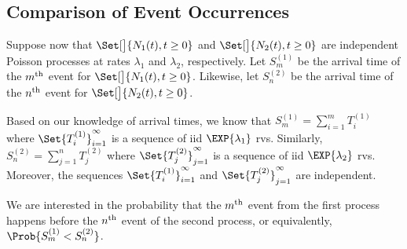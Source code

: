\subsection*{Comparison of Event Occurrences}
\begin{Regular}
    Suppose now that $ \Set[\big]{N_1(t),t\ge 0} $ and $ \Set[\big]{N_2(t),t\ge 0} $ are independent Poisson processes at
    rates $ \lambda_1 $ and $ \lambda_2 $, respectively. Let $ S_m^{(1)} $ be the arrival time of the $ m\textsuperscript{th} $
    event for $ \Set[\big]{N_1(t),t\ge 0} $. Likewise, let $ S_n^{(2)} $ be the arrival time of the $ n\textsuperscript{th} $
    event for $ \Set[\big]{N_2(t),t\ge 0} $.

    \vspace{2mm}

    Based on our knowledge of arrival times, we know that $ S_m^{(1)}=\sum_{i=1}^{m}T_i^{(1)} $
    where $ \Set{T_i^{(1)}}_{i=1}^\infty $ is a sequence of iid $ \EXP{\lambda_1} $ rvs. Similarly,
    $ S_n^{(2)}=\sum_{j=1}^{n}T_j^{(2)} $ where $ \Set{T_j^{(2)}}_{j=1}^\infty $ is a sequence of iid
    $ \EXP{\lambda_2} $ rvs. Moreover, the sequences $ \Set{T_i^{(1)}}_{i=1}^\infty $ and $ \Set{T_j^{(2)}}_{j=1}^\infty $ are independent.

    \vspace{2mm}

    We are interested in the probability that the $ m\textsuperscript{th} $ event from the first process happens before the $ n\textsuperscript{th} $
    event of the second process, or equivalently, $ \Prob{S_m^{(1)}<S_n^{(2)}} $.

    \vspace{2mm}


\end{Regular}
